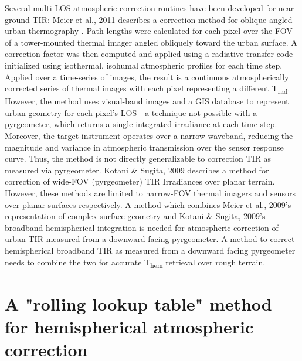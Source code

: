 Several multi-LOS atmospheric correction routines have been developed for near-ground TIR: Meier et al., 2011 describes a correction method for oblique angled urban thermography \cite{Meier2011}. Path lengths were calculated for each pixel over the FOV of a tower-mounted thermal imager angled obliquely toward the urban surface. A correction factor was then computed and applied using a radiative transfer code initialized using isothermal, isohumal atmospheric profiles for each time step. Applied over a time-series of images, the result is a continuous atmospherically corrected series of thermal images with each pixel representing a different T\textsubscript{rad}. However, the method uses visual-band images and a GIS database to represent urban geometry for each pixel's LOS - a technique not possible with a pyrgeometer, which returns a single integrated irradiance at each time-step. Moreover, the target instrument operates over a narrow waveband, reducing the magnitude and variance in atmospheric transmission over the sensor response curve. Thus, the method is not directly generalizable to correction TIR as measured via pyrgeometer.  Kotani \& Sugita, 2009 describes a method for correction of wide-FOV (pyrgeometer) TIR Irradiances \cite{Kotani2009a} over planar terrain. However, these methods are limited to narrow-FOV thermal imagers and sensors over planar surfaces respectively. A method which combines Meier et al., 2009's representation of complex surface geometry and Kotani \& Sugita, 2009's broadband hemispherical integration is needed for atmospheric correction of urban TIR measured from a downward facing pyrgeometer. A method to correct hemispherical broadband TIR as measured from a downward facing pyrgeometer needs to combine the two for accurate T\textsubscript{hem} retrieval over rough terrain. 

\section{A "rolling lookup table" method for hemispherical atmospheric correction}


